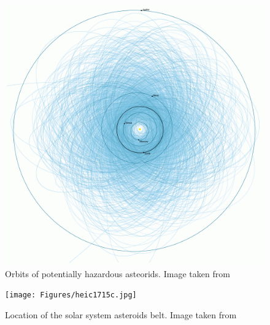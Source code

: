 \documentclass[12pt,%
               a4paper,%
               oneside,openany,%
               titlepage,%
               headinclude,footinclude,%
               BCOR5mm,%
               cleardoublepage=empty,%
               tablecaptionabove,%
               floatperchapter,
               ]{scrreprt}                 %
\begin{document}
\begin{figure}[h]
\begin{center}
\includegraphics[width=1\textwidth]{Figures/Orbit_asteorids.png}
\caption{Orbits of potentially hazardous asteorids. Image taken from \cite{orbits-of-potentially-hazardous}}
\label{Orbit_asteorids}
\end{center}
\end{figure}

\begin{figure}[h]
\begin{center}
\texttt{[image: Figures/heic1715c.jpg]}
\caption{Location of the solar system asteroids belt. Image taken from \cite{esahubble}}
\label{heic1715c}
\end{center}
\end{figure}
\end{document}
